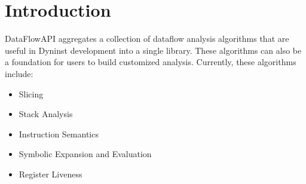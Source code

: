 \section{Introduction}
\label{sec:intro}

DataFlowAPI aggregates a collection of dataflow analysis algorithms that are
useful in Dyninst development into a single library. These algorithms can also
be a foundation for users to build customized analysis. Currently, these algorithms include:
\begin{itemize}
\item Slicing
\item Stack Analysis
\item Instruction Semantics
\item Symbolic Expansion and Evaluation
\item Register Liveness
\end{itemize}
